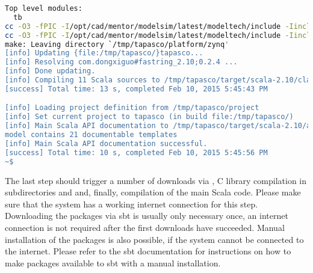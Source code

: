 \begin{enumerate}
\begin{lstlisting}[language=bash]
Top level modules:
  tb
cc -O3 -fPIC -I/opt/cad/mentor/modelsim/latest/modeltech/include -Iinclude -I../common/include -std=gnu99 -pedantic-errors -Wall -Werror  -shared -pthread -o lib/libplatform-server.so src/platform_server.c
cc -O3 -fPIC -I/opt/cad/mentor/modelsim/latest/modeltech/include -Iinclude -I../common/include -std=gnu99 -pedantic-errors -Wall -Werror  -shared -pthread -o lib/libplatform-client.so src/platform_client.c
make: Leaving directory `/tmp/tapasco/platform/zynq'
[info] Updating {file:/tmp/tapasco/}tapasco...
[info] Resolving com.dongxiguo#fastring_2.10;0.2.4 ...
[info] Done updating.
[info] Compiling 11 Scala sources to /tmp/tapasco/target/scala-2.10/classes...
[success] Total time: 13 s, completed Feb 10, 2015 5:45:43 PM

[info] Loading project definition from /tmp/tapasco/project
[info] Set current project to tapasco (in build file:/tmp/tapasco/)
[info] Main Scala API documentation to /tmp/tapasco/target/scala-2.10/api...
model contains 21 documentable templates
[info] Main Scala API documentation successful.
[success] Total time: 10 s, completed Feb 10, 2015 5:45:56 PM
~$ 
        \end{lstlisting}
\end{enumerate}
The last step should trigger a number of downloads via , C library compilation in subdirectories  and  and, finally, compilation of the main Scala code.
Please make sure that the system has a working internet connection for this step.
Downloading the packages via sbt is usually only necessary once, an internet connection is not required after the first downloads have succeeded.
Manual installation of the packages is also possible, if the system cannot be connected to the internet.
Please refer to the sbt documentation for instructions on how to make packages available to sbt with a manual installation.

